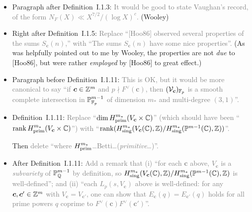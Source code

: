 \documentclass[12pt]{article}
\begin{document}
\begin{itemize}
    \item Paragraph after Definition~I.1.3:
    \textcolor{gray}{It would be good to state Vaughan's record, of the form $N_F(X)\ll X^{7/2}/(\log{X})^c$.}
    (Wooley)
    
    \item Right after Definition~I.1.5:
    \textcolor{gray}{Replace ``[Hoo86] observed several properties of the sums $S_{\bm{c}}(n)$,'' with ``The sums $S_{\bm{c}}(n)$ have some nice properties''.}
    (As was helpfully pointed out to me by Wooley, the properties are not \emph{due} to [Hoo86], but were rather \emph{employed} by [Hoo86] to great effect.)
    
    \item Paragraph before Definition~I.1.11:
    \textcolor{gray}{This is OK,
    but it would be more canonical to say ``if $\bm{c}\in \mathbb{Z}^m$ and $p\nmid F^\vee(\bm{c})$, then $(\mathcal{V}_{\bm{c}})_{\mathbb{F}_p}$ is a smooth complete intersection in $\mathbb{P}^{m-1}_{\mathbb{F}_p}$ of dimension $m_\ast$ and multi-degree $(3,1)$''.}
    
    \item Definition~I.1.11:
    \textcolor{gray}{Replace ``$\dim H^{m_\ast}_{\operatorname{prim}}(V_{\bm{c}}\times\mathbb{C})$'' (which should have been ``$\operatorname{rank} H^{m_\ast}_{\operatorname{prim}}(V_{\bm{c}}\times\mathbb{C})$'')
    with ``$\operatorname{rank}(H^{m_\ast}_\textnormal{sing}(V_{\bm{c}}(\mathbb{C}),\mathbb{Z})/H^{m_\ast}_\textnormal{sing}(\mathbb{P}^{m-1}(\mathbb{C}),\mathbb{Z}))$''.}
    
    Then \textcolor{gray}{delete ``where $H^{m_\ast}_{\operatorname{prim}}$\dots Betti\dots (\emph{primitive}\dots)''.}
    
    \item After Definition~I.1.11:
    \textcolor{gray}{Add a remark that
    (i) ``for each $\bm{c}$ above,
    $V_{\bm{c}}$ is a \emph{subvariety} of $\mathbb{P}^{m-1}_{\mathbb{Q}}$ by definition,
    so $H^{m_\ast}_\textnormal{sing}(V_{\bm{c}}(\mathbb{C}),\mathbb{Z})/H^{m_\ast}_\textnormal{sing}(\mathbb{P}^{m-1}(\mathbb{C}),\mathbb{Z})$ is well-defined'';
    and (ii) ``each $L_p(s,V_{\bm{c}})$ above is well-defined:
    for any $\bm{c},\bm{c}'\in \mathbb{Z}^m$ with $V_{\bm{c}}=V_{\bm{c}'}$,
    one can show that $E_{\bm{c}}(q) = E_{\bm{c}'}(q)$ holds for all prime powers $q$ coprime to $F^\vee(\bm{c})F^\vee(\bm{c}')$''.}
    

\end{itemize}
\end{document}
